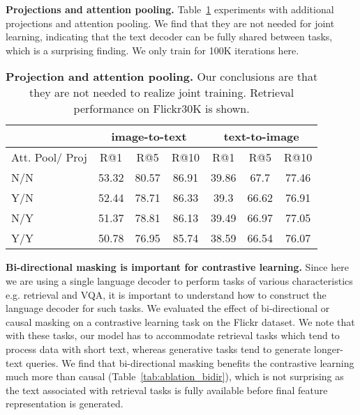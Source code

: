 \documentclass[10pt]{article} \usepackage[accepted]{tmlr}
\newcommand{\tablestyle}[2]{\setlength{\tabcolsep}{#1}\renewcommand{\arraystretch}{#2}\centering\footnotesize}
\begin{document}
\textbf{Projections and attention pooling.}
Table~\ref{tab:ablation_proj} experiments with additional projections and attention pooling. We find that they are not needed for joint learning, indicating that the text decoder can be fully shared between tasks, which is a surprising finding. We only train for 100K iterations here.

\begin{table}\centering
\small
\tablestyle{5.5pt}{1.1}
\begin{tabular}{l|ccc|ccc}
& \multicolumn{3}{c|}{image-to-text} & \multicolumn{3}{c}{text-to-image} \\ \hline
Att. Pool/ Proj       & R@1  & R@5  & R@10 & R@1  & R@5   & R@10      \\
\hline
N/N &53.32 &80.57 &86.91 &39.86 &67.7 &77.46 \\
Y/N &52.44 &78.71 &86.33 &39.3 &66.62 &76.91 \\
N/Y &51.37 &78.81 &86.13 &39.49 &66.97 &77.05 \\
Y/Y &50.78 &76.95 &85.74 &38.59 &66.54 &76.07 \\
\hline
\end{tabular}
\vspace{2mm}
\caption{\textbf{Projection and attention pooling.} Our conclusions are that they are not needed to realize joint training. Retrieval performance on Flickr30K is shown.}
\label{tab:ablation_proj}
\vspace{-2mm}
\end{table}

\textbf{Bi-directional masking is important for contrastive learning.}
Since here we are using a single language decoder to perform tasks of various characteristics e.g. retrieval and VQA, it is important to understand how to construct the language decoder for such tasks. We evaluated the effect of bi-directional or causal masking on a contrastive learning task on the Flickr dataset. We note that with these tasks, our model has to accommodate retrieval tasks which tend to process data with short text, whereas generative tasks tend to generate longer-text queries. We find that bi-directional masking benefits the contrastive learning much more than causal (Table~\ref{tab:ablation_bidir}), which is not surprising as the text associated with retrieval tasks is fully available before final feature representation is generated. 
\end{document}
